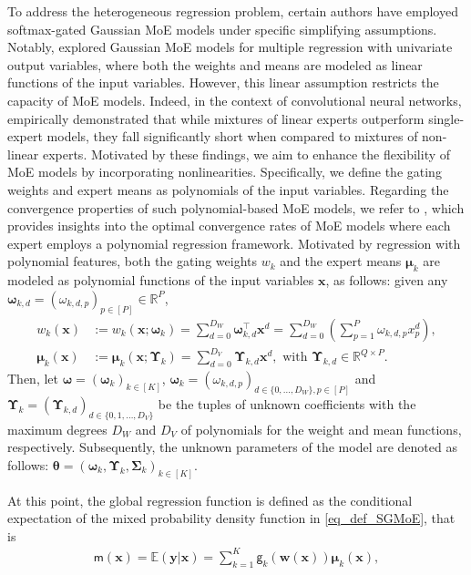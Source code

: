 \documentclass{article}
\newcommand{\nn}{\nonumber} %
\newcommand{\Ep}[1]{\mathbb{E}\left(#1\right)}
\def\sfg{\mathsf{g}}
\def\sfm{\mathsf{m}}
\def\vmu{{\bm{\mu}}}
\def\vomega{{\bm{\omega}}}
\def\vtheta{{\bm{\theta}}}
\def\vw{{\bm{w}}}
\def\vx{{\bm{x}}}
\def\vy{{\bm{y}}}
\def\evx{{x}}
\def\mSigma{{\bm{\Sigma}}}
\def\mUpsilon{{\bm{\Upsilon}}}
\def\sR{{\mathbb{R}}}
\begin{document}
To address the heterogeneous regression problem, certain authors have employed softmax-gated Gaussian MoE models under specific simplifying assumptions. Notably, \cite{chamroukhi2019regularizedIJCNN,chamroukhi2019regularized} explored Gaussian MoE models for multiple regression with univariate output variables, where both the weights and means are modeled as linear functions of the input variables. However, this linear assumption restricts the capacity of MoE models. Indeed, in the context of convolutional neural networks, \cite{chen_towards_2022} empirically demonstrated that while mixtures of linear experts outperform single-expert models, they fall significantly short when compared to mixtures of non-linear experts.
Motivated by these findings, we aim to enhance the flexibility of MoE models by incorporating nonlinearities. Specifically, we define the gating weights and expert means as polynomials of the input variables. Regarding the convergence properties of such polynomial-based MoE models, we refer to \cite{mendes2012convergence}, which provides insights into the optimal convergence rates of MoE models where each expert employs a polynomial regression framework.
Motivated by regression with polynomial features, both the gating weights $w_k$ and the expert means $\vmu_k$ are modeled as polynomial functions of the input variables $\vx$, as follows: given any $\vomega_{k,d} = (\omega_{k,d,p})_{p\in[P]}\in \sR^P$,
\begin{align}
	w_k(\vx) &:=w_k(\vx;\vomega_k)\!=\! 
    \sum_{d=0}^{D_W}\vomega_{k,d}^\top \vx^d\!=\!\sum_{d=0}^{D_W}\left(\sum_{p=1}^{P}\omega_{k,d,p}\evx_p^d\right),\nonumber\\
	\vmu_k (\vx) &:=\vmu_k (\vx;\mUpsilon_k)\!= \!\sum_{d=0}^{D_V} \!\mUpsilon_{k,d} \vx^d, \text{ with } \mUpsilon_{k,d} \!\in \!\sR^{Q \times P}.\nn
\end{align}
Then, let $\vomega = \left(\vomega_k\right)_{k\in[K]}$, $\vomega_k = \left(\omega_{k,d,p}\right)_{  d\in\{0,\ldots,D_W\},p\in [P]}$ and $\mUpsilon_k = \left(\mUpsilon_{k,d}\right)_{d\in\{0,1,\ldots,D_V\}}$ be the tuples of unknown coefficients with the maximum degrees $D_{W}$ and $D_{V}$ of polynomials for the weight and mean functions, respectively.
Subsequently, the unknown parameters of the model are denoted as follows: $\vtheta = \left(\vomega_k, \mUpsilon_k, \mSigma_k\right)_{k \in [K]}.$

At this point, the global regression function is defined as the conditional expectation of the mixed probability density function in \cref{eq_def_SGMoE}, that is
\begin{align}\label{eq_def_SGaBloME_Expectation}
	\sfm(\vx) = \Ep{\vy \vert \vx} = \sum_{k=1}^{K}\sfg_k (\vw(\vx)) \vmu_k(\vx),
\end{align}
\end{document}
